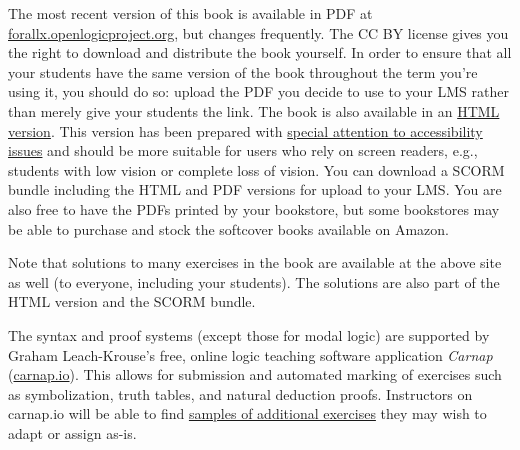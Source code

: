 The most recent version of this book is available in PDF at
\href{https://forallx.openlogicproject.org}{forallx.openlogicproject.org},
but changes frequently.  The CC BY license gives you the right to
download and distribute the book yourself. In order to ensure that all
your students have the same version of the book throughout the term
you're using it, you should do so: upload the PDF you decide to use to
your LMS rather than merely give your students the link. The book is
also available in an
\href{https://forallx.openlogicproject.org/html/}{HTML version}. This
version has been prepared with
\href{https://forallx.openlogicproject.org/html/A4.html}{special
attention to accessibility issues} and should be more suitable for
users who rely on screen readers, e.g., students with low vision or
complete loss of vision. You can download a SCORM bundle including the
HTML and PDF versions for upload to your LMS. You are also free to
have the PDFs printed by your bookstore, but some bookstores may be
able to purchase and stock the softcover books available on Amazon.

Note that solutions to many exercises in the book are available at the
above site as well (to everyone, including your students). The
solutions are also part of the HTML version and the SCORM bundle.

The syntax and proof systems (except those for modal logic) are supported by Graham Leach-Krouse's free, online logic teaching software application \textit{Carnap} (\href{https://carnap.io}{carnap.io}). This allows for submission and automated marking of exercises such as symbolization, truth tables, and natural deduction proofs.  Instructors on carnap.io will be able to find \href{https://carnap.io/shared/rzach@ucalgary.ca/forall%20x:%20Calgary.md}{samples of additional exercises} they may wish to adapt or assign as-is.